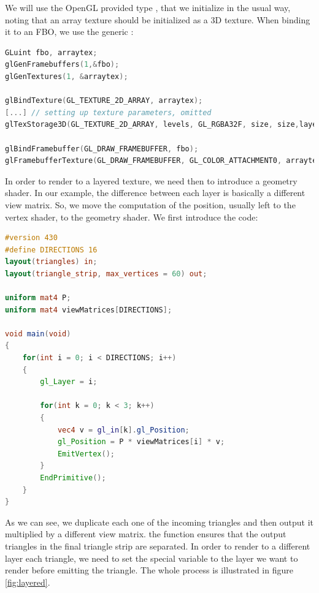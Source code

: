 We will use the OpenGL provided type , that we initialize in the usual way, noting that an array texture should be initialized as a 3D texture. When binding it to an FBO, we use the generic :

\begin{lstlisting}[language=C++,label=lst:initarraytexture,caption={Initializing array texture. Note that the number of layers is passed to the \gl{glTexStorage3D} command.}]
GLuint fbo, arraytex;
glGenFramebuffers(1,&fbo);
glGenTextures(1, &arraytex);

glBindTexture(GL_TEXTURE_2D_ARRAY, arraytex);
[...] // setting up texture parameters, omitted
glTexStorage3D(GL_TEXTURE_2D_ARRAY, levels, GL_RGBA32F, size, size,layers);

glBindFramebuffer(GL_DRAW_FRAMEBUFFER, fbo);
glFramebufferTexture(GL_DRAW_FRAMEBUFFER, GL_COLOR_ATTACHMENT0, arraytex, 0);
\end{lstlisting}

In order to render to a layered texture, we need then to introduce a geometry shader. In our example, the difference between each layer is basically a different view matrix. So, we move the computation of the position, usually left to the vertex shader, to the geometry shader. We first introduce the code:

\begin{lstlisting}[language=GLSL,label=lst:arraygeomshader,caption={Geometry shader for layered rendering. The multiplication by the model matrix of vertex v is performed in the vertex shader (not shown).}]
#version 430
#define DIRECTIONS 16
layout(triangles) in;
layout(triangle_strip, max_vertices = 60) out;

uniform mat4 P;
uniform mat4 viewMatrices[DIRECTIONS];

void main(void)
{
    for(int i = 0; i < DIRECTIONS; i++)
    {
        gl_Layer = i;

        for(int k = 0; k < 3; k++)
        {
            vec4 v = gl_in[k].gl_Position;
            gl_Position = P * viewMatrices[i] * v;
            EmitVertex();
        }
        EndPrimitive();
    }
}
\end{lstlisting}

As we can see, we duplicate each one of the incoming triangles and then output it multiplied by a different view matrix. the  function ensures that the output triangles in the final triangle strip are separated. In order to render to a different layer each triangle, we need to set the special  variable to the layer we want to render before emitting the triangle. The whole process is illustrated in figure \ref{fig:layered}.

